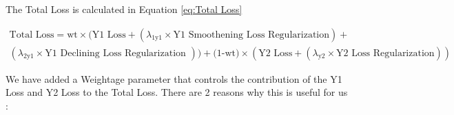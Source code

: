 \documentclass{report} %
\begin{document}
\vspace{0.2cm} %

The Total Loss is calculated in Equation \ref{eq:Total Loss}

\vspace{0.2cm} %

\begin{equation}
    \begin{split}
\text{Total Loss} = \text{wt} \times (\text{Y1 Loss} + (\lambda_{\text{1y1}} \times \text{Y1 Smoothening Loss Regularization}) + \\
(\lambda_{\text{2y1}} \times \text{Y1 Declining Loss Regularization })) + \text{(1-wt)} \times (\text{Y2 Loss} + (\lambda_{\text{y2}} \times \text{Y2 Loss Regularization}))
    \end{split}
    \label{eq:Total Loss}
\end{equation}


\vspace{1em} %

We have added a Weightage parameter that controls the contribution of the Y1 Loss and Y2 Loss to the Total Loss. There are 2 reasons why this is useful for us :\\
\end{document}
